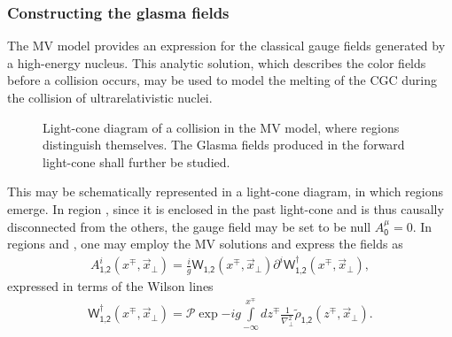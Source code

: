 \subsubsection*{Constructing the glasma fields} 
The {\sffamily MV} model provides an expression for the classical gauge fields generated by a high-energy nucleus. This analytic solution, which describes the color fields before a collision occurs, may be used to model the melting of the {\sffamily CGC} during the collision of ultrarelativistic nuclei.

\begin{figure}[!hbt]
	\centering
    
    \caption{\normalsize Light-cone diagram of a collision in the {\sffamily MV} model, where {} regions distinguish themselves. The Glasma fields produced in the forward light-cone shall further be studied.}
\end{figure}

This may be schematically represented in a light-cone diagram, in which {} regions emerge. In region {}, since it is enclosed in the past light-cone and is thus causally disconnected from the others, the gauge field may be set to be null $A^\mu_{\textsf{0}}=0$. In regions {} and {}, one may employ the {\sffamily MV} solutions and express the fields as
\begin{align}\label{sglasma1}
    A^i_{\textsf{1},\textsf{2}}(x^\mp,\vec{x}_\perp)=\frac{i}{g}\textsf{W}_{\textsf{1},\textsf{2}}(x^\mp,\vec{x}_\perp)\partial^i\textsf{W}_{\textsf{1},\textsf{2}}^\dag(x^\mp,\vec{x}_\perp),
\end{align}
expressed in terms of the Wilson lines
\begin{align*}
    \textsf{W}_{\textsf{1},\textsf{2}}^\dag(x^\mp,\vec{x}_\perp)=\mathcal{P}\exp{-ig\int\limits_{-\infty}^{x^\mp}dz^\mp\frac{1}{\nabla_\perp^2}\widetilde{\rho}_{\textsf{1},\textsf{2}}(z^\mp,\vec{x}_\perp)}.
\end{align*}

